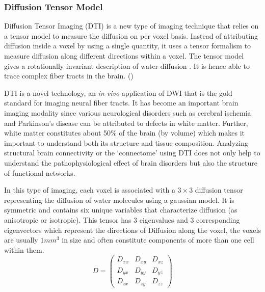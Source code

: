 \documentclass[msthesis.tex]{subfiles}
\begin{document}
\subsubsection{Diffusion Tensor Model}
Diffusion Tensor Imaging (DTI) is a new type of imaging technique that relies on a tensor model to measure the diffusion on per voxel basis. Instead of attributing diffusion inside a voxel by using a single quantity, it uses a tensor formalism to measure diffusion along different directions within a voxel. The tensor model gives a rotationally invariant description of water diffusion . It is hence able to trace complex fiber tracts in the brain. (\cite{jones2010diffusion})

DTI is a novel technology, an \textit{in-vivo } application of DWI that is the gold standard for imaging neural fiber tracts. It has become an important brain imaging modality since various neurological disorders such as cerebral ischemia and Parkinson’s disease can be attributed to defects in white matter. Further, white matter constitutes about 50\% of the brain (by volume) which makes it important to understand both its structure and tissue composition. Analyzing structural brain connectivity or the ‘connectome’ using DTI does not only help to understand the pathophysiological effect of brain disorders but also the structure of functional networks.

In this type of imaging, each voxel is associated with a $3 \times 3$ diffusion tensor representing the diffusion of water molecules using a gaussian model. It is symmetric and contains six unique variables that characterize diffusion (as anisotropic or isotropic). This tensor has 3 eigenvalues and 3 corresponding eigenvectors which represent the directions of Diffusion along the voxel, the voxels are usually $1 mm^3$ in size and often constitute components of more than one cell within them.
\begin{equation*}
D =
\begin{pmatrix}
D_{xx} & D_{xy} & D_{xz} \\
D_{yx} & D_{yy} & D_{yz} \\
D_{zx} & D_{zy} & D_{zz}
\end{pmatrix}  
\end{equation*}
\end{document}
